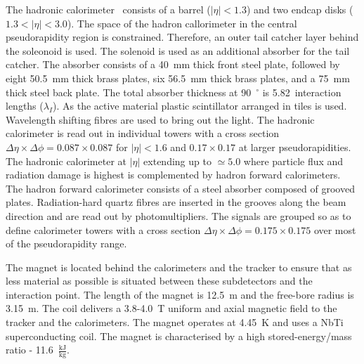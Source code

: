 The hadronic calorimeter~\cite{HCAL_report} consists of a barrel ($\left|\eta\right|<1.3$) and two endcap disks ($1.3<\left|\eta\right|<3.0$). The space of the hadron callorimeter in the central pseudorapidity region is constrained. Therefore, an outer tail catcher layer behind the soleonoid is used. The solenoid is used as an additional absorber for the tail catcher. The absorber consists of a 40~mm thick front steel plate, followed by eight 50.5~mm thick brass plates, six 56.5~mm thick brass plates, and a 75~mm thick steel back plate. The total absorber thickness at 90~$^{\circ}$ is 5.82~interaction lengths ($\lambda_{I}$). As the active material plastic scintillator arranged in tiles is used. Wavelength shifting fibres are used to bring out the light. The hadronic calorimeter is read out in individual towers with a cross section $\Delta\eta\times\Delta\phi=0.087\times0.087$ for $\left|\eta\right|<1.6$ and $0.17\times0.17$ at larger pseudorapidities. The hadronic calorimeter at  $\left|\eta\right|$ extending up to $\simeq5.0$ where particle flux and radiation damage is highest is complemented by hadron forward calorimeters. The hadron forward calorimeter consists of a steel absorber composed of grooved plates. Radiation-hard quartz fibres are inserted in the grooves along the beam direction and are read out by photomultipliers. The signals are grouped so as to define calorimeter towers with a cross section $\Delta\eta\times\Delta\phi=0.175\times0.175$ over most of the pseudorapidity range. 

The magnet is located behind the calorimeters and the tracker to ensure that as less material as possible is situated between these subdetectors and the interaction point. The length of the magnet is 12.5~m and the free-bore radius is 3.15~m. The coil delivers a 3.8-4.0~T uniform and axial magnetic field to the tracker and the calorimeters. The magnet operates at 4.45~K and uses a NbTi superconducting coil. The magnet is characterised by a high stored-energy/mass ratio - 11.6~$\frac{\text{kJ}}{\text{kg}}$.

